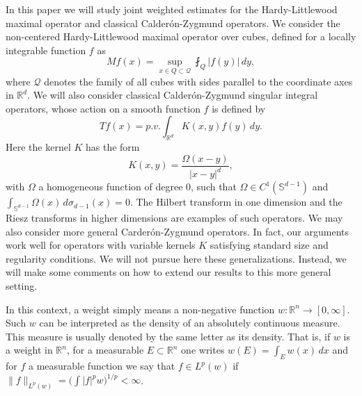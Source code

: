 \documentclass[11pt]{amsart}
\theoremstyle{definition}
\begin{document}
In this paper we will study joint weighted estimates for the Hardy-Littlewood maximal operator and classical Calder\'on-Zygmund operators. We consider the non-centered Hardy-Littlewood maximal operator over cubes, defined for a locally integrable function $f$ as
\[
Mf(x)=\sup_{x\in Q\subset \mathcal Q} \fint_Q |f(y)|\,dy,
\]
where $\mathcal Q$ denotes the family of all cubes with sides parallel to the coordinate axes in ${\mathbb{R}}^d$. We will also consider classical Calder\'on-Zygmund singular integral operators, whose action on a smooth function $f$ is defined by
\[
Tf(x)=p.v.\int_{{\mathbb{R}}^d} K(x,y)f(y)\,dy.
\]
Here the kernel $K$ has the form
\begin{equation}\label{nucleo}
K(x,y)=\frac{\Omega(x-y)}{|x-y|^d},
\end{equation}
with $\Omega$ a homogeneous function of degree 0, such that $\Omega\in C^1(\mathbb S^{d-1})$ and $\int_{\mathbb S^{d-1}}\Omega(x)\,d\sigma_{d-1}(x)=0$. The Hilbert transform in one dimension and the Riesz transforms in higher dimensions are examples of such operators. We may also consider more general Carder\'on-Zygmund operators. In fact, our arguments work well for operators with variable kernels $K$ satisfying standard size and regularity conditions. We will not pursue here these generalizations. Instead, we will make some comments on how to extend our results to this more general setting. 

\bigskip

In this context, a weight simply means a non-negative function $w:{\mathbb{R}}^n\rightarrow [0,\infty]$. Such $w$ can be interpreted as the density of an absolutely continuous measure. This measure is usually denoted by the same letter as its density. That is, if $w$ is a weight in ${\mathbb{R}}^n$, for a measurable $E\subset {\mathbb{R}}^n$ one writes $w(E)=\int_E w(x)\,dx$ and for $f$ a measurable function we say that $f\in L^p(w)$ if $\|f\|_{L^p(w)}=\big(\int |f|^p w\bigr)^{1/p}<\infty$.

\bigskip
\end{document}
